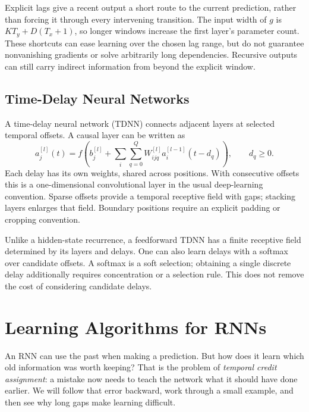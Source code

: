 \documentclass[11pt, oneside]{book}
\let\originalsection\section
\renewcommand{\section}{\Needspace{7\baselineskip}\originalsection}
\begin{document}
Explicit lags give a recent output a short route to the current prediction, rather than forcing it through every intervening transition. The input width of $g$ is $KT_y+D(T_x+1)$, so longer windows increase the first layer's parameter count. These shortcuts can ease learning over the chosen lag range, but do not guarantee nonvanishing gradients or solve arbitrarily long dependencies. Recursive outputs can still carry indirect information from beyond the explicit window.

\section{Time-Delay Neural Networks}\label{sec:source-1-6}
A time-delay neural network (TDNN) connects adjacent layers at selected temporal offsets. A causal layer can be written as
\[
 a_j^{[l]}(t)=f\!\left(b_j^{[l]}+
 \sum_i\sum_{q=0}^{Q}W_{ijq}^{[l]}a_i^{[l-1]}(t-d_q)\right),
 \qquad d_q\geq0.
\]
Each delay has its own weights, shared across positions. With consecutive offsets this is a one-dimensional convolutional layer in the usual deep-learning convention. Sparse offsets provide a temporal receptive field with gaps; stacking layers enlarges that field. Boundary positions require an explicit padding or cropping convention.

Unlike a hidden-state recurrence, a feedforward TDNN has a finite receptive field determined by its layers and delays. One can also learn delays with a softmax over candidate offsets. A softmax is a soft selection; obtaining a single discrete delay additionally requires concentration or a selection rule. This does not remove the cost of considering candidate delays.

\chapter{Learning Algorithms for RNNs}\label{ch:source-2}

An RNN can use the past when making a prediction. But how does it learn which old information was worth keeping? That is the problem of \emph{temporal credit assignment}: a mistake now needs to teach the network what it should have done earlier. We will follow that error backward, work through a small example, and then see why long gaps make learning difficult.
\end{document}
